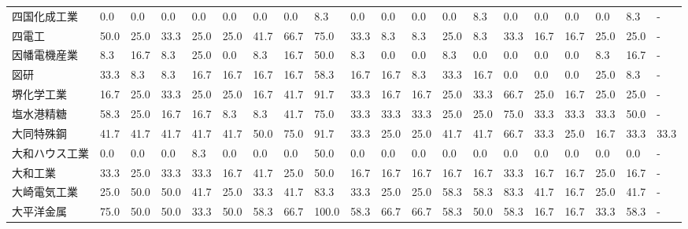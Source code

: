 \documentclass[a4paper，11pt]{jsarticle}
\begin{document}
\begin{longtable}[c]{lp{3mm}p{3mm}p{3mm}p{3mm}p{3mm}p{3mm}p{3mm}p{3mm}p{3mm}p{3mm}p{3mm}p{3mm}p{3mm}p{3mm}p{3mm}p{3mm}p{3mm}p{3mm}p{3mm}}
四国化成工業          &    0.0 &    0.0 &       0.0 &       0.0 &        0.0 &    0.0 &    0.0 &    8.3 &     0.0 &     0.0 &    0.0 &   0.0 &    8.3 &     0.0 &     0.0 &   0.0 &   0.0 &   8.3 &     - \\
四電工             &   50.0 &   25.0 &      33.3 &      25.0 &       25.0 &   41.7 &   66.7 &   75.0 &    33.3 &     8.3 &    8.3 &  25.0 &    8.3 &    33.3 &    16.7 &  16.7 &  25.0 &  25.0 &     - \\
因幡電機産業          &    8.3 &   16.7 &       8.3 &      25.0 &        0.0 &    8.3 &   16.7 &   50.0 &     8.3 &     0.0 &    0.0 &   8.3 &    0.0 &     0.0 &     0.0 &   0.0 &   8.3 &  16.7 &     - \\
図研              &   33.3 &    8.3 &       8.3 &      16.7 &       16.7 &   16.7 &   16.7 &   58.3 &    16.7 &    16.7 &    8.3 &  33.3 &   16.7 &     0.0 &     0.0 &   0.0 &  25.0 &   8.3 &     - \\
堺化学工業           &   16.7 &   25.0 &      33.3 &      25.0 &       25.0 &   16.7 &   41.7 &   91.7 &    33.3 &    16.7 &   16.7 &  25.0 &   33.3 &    66.7 &    25.0 &  16.7 &  25.0 &  25.0 &     - \\
塩水港精糖           &   58.3 &   25.0 &      16.7 &      16.7 &        8.3 &    8.3 &   41.7 &   75.0 &    33.3 &    33.3 &   33.3 &  25.0 &   25.0 &    75.0 &    33.3 &  33.3 &  33.3 &  50.0 &     - \\
大同特殊鋼           &   41.7 &   41.7 &      41.7 &      41.7 &       41.7 &   50.0 &   75.0 &   91.7 &    33.3 &    25.0 &   25.0 &  41.7 &   41.7 &    66.7 &    33.3 &  25.0 &  16.7 &  33.3 &  33.3 \\
大和ハウス工業         &    0.0 &    0.0 &       0.0 &       8.3 &        0.0 &    0.0 &    0.0 &   50.0 &     0.0 &     0.0 &    0.0 &   0.0 &    0.0 &     0.0 &     0.0 &   0.0 &   0.0 &   0.0 &     - \\
大和工業            &   33.3 &   25.0 &      33.3 &      33.3 &       16.7 &   41.7 &   25.0 &   50.0 &    16.7 &    16.7 &   16.7 &  16.7 &   16.7 &    33.3 &    16.7 &  16.7 &  25.0 &  16.7 &     - \\
大崎電気工業          &   25.0 &   50.0 &      50.0 &      41.7 &       25.0 &   33.3 &   41.7 &   83.3 &    33.3 &    25.0 &   25.0 &  58.3 &   58.3 &    83.3 &    41.7 &  16.7 &  25.0 &  41.7 &     - \\
大平洋金属           &   75.0 &   50.0 &      50.0 &      33.3 &       50.0 &   58.3 &   66.7 &  100.0 &    58.3 &    66.7 &   66.7 &  58.3 &   50.0 &    58.3 &    16.7 &  16.7 &  33.3 &  58.3 &     - \\

\end{longtable}
\end{document}
